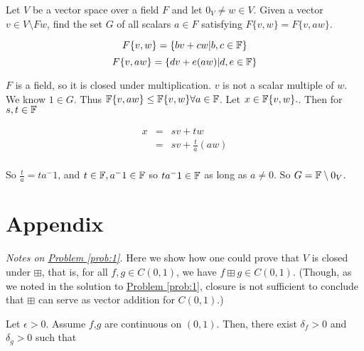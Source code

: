 \begin{problem}[Golan 105]

Let $V$ be a vector space over a field $F$ and let $0_V \neq w \in V$.  Given a
vector $v \in V \setminus Fw$, find the set $G$ of all scalars $a \in F$
satisfying $F\{v, w\} = F\{v, aw\}$.

\end{problem}
\smallskip
\begin{solution}

$$F\{v,w\} = \{bv + cw | b,c \in \mathbb{F} \} $$
$$F\{v,aw\} = \{dv + e(aw) | d,e \in \mathbb{F}\}$$

$F$ is a field, so it is closed under multiplication. $v$ is not a scalar multiple of $w$. We know $1 \in G$. Thus $\mathbb{F}\{v,aw\} \leq \mathbb{F}\{v,w\} \forall a \in \mathbb{F}$. Let $x \in \mathbb{F}\{v,w\}.$. Then for $s,t \in \mathbb{F}$

\begin{eqnarray*}
x & = & sv + tw  \\
  & = & sv + \frac{t}{a}(aw) \\
\end{eqnarray*}

So $\frac{t}{a} = ta^-1$, and $t \in \mathbb{F}, a^-1 \in \mathbb{F}$ so $ta^-1 \in \mathbb{F}$ as long as $a \neq 0$. So $G = \mathbb{F} \setminus 0_V$.
\end{solution}
\probskip


\section*{Appendix}
\label{appendix}

{\it Notes on \hyperref[prob:1]{Problem \ref*{prob:1}}.}
Here we show how one could prove that $V$ is closed under $\boxplus$, that is, 
for all $f, g \in C(0,1)$, we have $f \boxplus g \in C(0,1)$. (Though, as we
noted in the solution to
\hyperref[prob:1]{Problem \ref*{prob:1}}, closure is not sufficient
to conclude that $\boxplus$ can serve as vector addition for $C(0,1)$.)

Let $\epsilon > 0$. Assume $f$,$g$ are continuous on $(0,1)$. Then, there exist $\delta_f > 0$ and $\delta_g > 0$ such that

